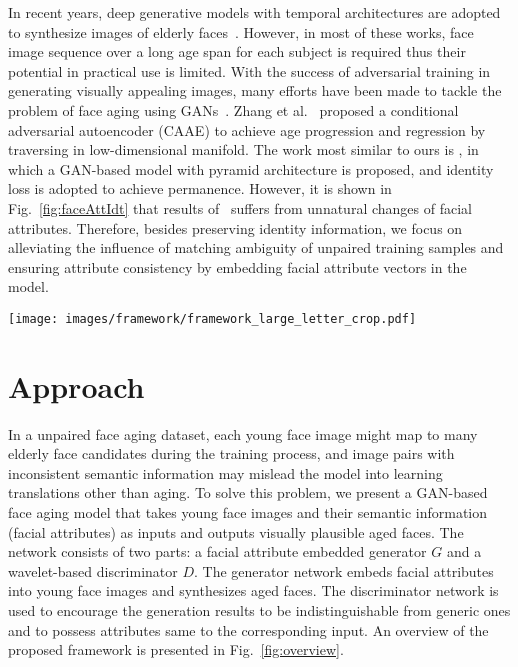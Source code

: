 \documentclass[10pt,twocolumn,letterpaper]{article}
\begin{document}
In recent years, deep generative models with temporal architectures are adopted to synthesize images of elderly faces~\cite{wang2016recurrent,duong2016longitudinal,duong2017temporal}. However, in most of these works, face image sequence over a long age span for each subject is required thus their potential in practical use is limited. 
With the success of adversarial training in generating visually appealing images, many efforts have been made to tackle the problem of face aging using GANs~\cite{goodfellow2014generative}. Zhang et al.~\cite{zhang2017age} proposed a conditional adversarial autoencoder (CAAE) to achieve age progression and regression by traversing in low-dimensional manifold. 
The work most similar to ours is \cite{yang2017learning}, in which a GAN-based model with pyramid architecture is proposed, and identity loss is adopted to achieve permanence. 
However, it is shown in Fig.~\ref{fig:faceAttIdt} that results of~\cite{yang2017learning} suffers from unnatural changes of facial attributes.
Therefore, besides preserving identity information, we focus on alleviating the influence of matching ambiguity of unpaired training samples and ensuring attribute consistency by embedding facial attribute vectors in the model.

\begin{figure*}[ht]
\begin{center}
\texttt{[image: images/framework/framework\_large\_letter\_crop.pdf]}
\end{center}
\caption{An overview of the proposed face aging framework. An hourglass-shaped generator $G$ learns the age mapping and outputs lifelike elderly face images. A discriminator $D$ is employed to distinguish synthesized face images from generic ones, based on multi-scale wavelet coefficients computed by the wavelet packet transform module. The $p$-dimensional attribute vector describing the input face image is embedded to both the generator and the discriminator to reduce matching ambiguity inherent to unpaired training data and ensure facial attribute consistency.}
\label{fig:overview}
\end{figure*}

\section{Approach}
In a unpaired face aging dataset, each young face image might map to many elderly face candidates during the training process, and image pairs with inconsistent semantic information may mislead the model into learning translations other than aging.
To solve this problem, we present a GAN-based face aging model that takes young face images and their semantic information (\ie facial attributes) as inputs and outputs visually plausible aged faces.
The network consists of two parts: a facial attribute embedded generator $G$ and a wavelet-based discriminator $D$. The generator network embeds facial attributes into young face images and synthesizes aged faces. The discriminator network is used to encourage the generation results to be indistinguishable from generic ones and to possess attributes same to the corresponding input.
An overview of the proposed framework is presented in Fig.~\ref{fig:overview}.
\end{document}
